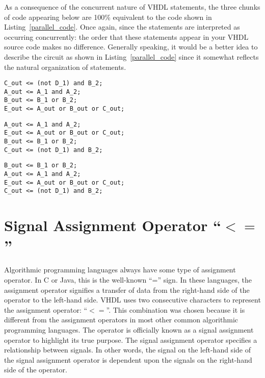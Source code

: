 As a consequence of the concurrent nature of VHDL statements, the three chunks of code appearing below are 100\% equivalent to the code shown in Listing~\ref{parallel_code}. Once again, since the statements are interpreted as occurring concurrently: the order that these statements appear in your VHDL source code makes no difference. Generally speaking, it would be a better idea to describe the circuit as shown in Listing~\ref{parallel_code} since it somewhat reflects the natural organization of statements.

\noindent
\begin{minipage}{0.99\linewidth}
\begin{lstlisting}[label=parallel_code_2, caption=Equivalent VHDL code for the circuit of Figure 4.1. ]
C_out <= (not D_1) and B_2; 
A_out <= A_1 and A_2;   
B_out <= B_1 or B_2; 
E_out <= A_out or B_out or C_out;
\end{lstlisting}
\begin{lstlisting}[label=parallel_code_3, caption=Equivalent VHDL code for the circuit of Figure 4.1.]
A_out <= A_1 and A_2;   
E_out <= A_out or B_out or C_out;
B_out <= B_1 or B_2; 
C_out <= (not D_1) and B_2; 
\end{lstlisting}
\begin{lstlisting}[label=parallel_code_4, caption=Equivalent VHDL code for the circuit of Figure 4.1.]
B_out <= B_1 or B_2; 
A_out <= A_1 and A_2;   
E_out <= A_out or B_out or C_out;
C_out <= (not D_1) and B_2; 
\end{lstlisting}
\end{minipage}

\section{Signal Assignment Operator \texorpdfstring{``$<=$''}{<=}}
Algorithmic programming languages always have some type of assignment operator. In C or Java, this is the well-known ``='' sign. In these languages, the assignment operator signifies a transfer of data from the right-hand side of the operator to the left-hand side. VHDL uses two consecutive characters to represent the assignment operator: ``\texttt{$<=$}''. This combination was chosen because it is different from the assignment operators in most other common algorithmic programming languages. The operator is officially known as a signal assignment operator to highlight its true purpose. The signal assignment operator specifies a relationship between signals. In other words, the signal on the left-hand side of the signal assignment operator is dependent upon the signals on the right-hand side of the operator.

